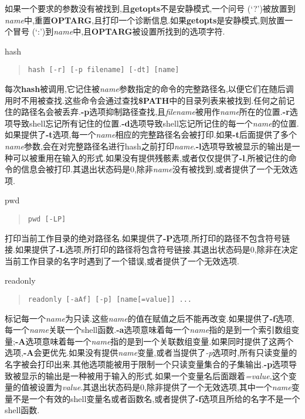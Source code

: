 \documentclass[draft,openany]{book}
\begin{document}
\begin{CJK}{UTF8}{gbsn}
\begin{basedescript}{\desclabelstyle{\nextlinelabel}\desclabelwidth{2.5em}}
        如果一个要求的参数没有被找到,且\textbf{getopts}不是安静模式,一个问号 (`?')被放置到\emph{name}中,重置\textbf{OPTARG},且打印一个诊断信息.如果\textbf{getopts}是安静模式,则放置一个冒号 (`:')到\emph{name}中,且\textbf{OPTARG}被设置所找到的选项字符.
    \item[hash]
        \begin{quote}
            \verb+hash [-r] [-p filename] [-dt] [name]+
        \end{quote}
        每次\textbf{hash}被调用,它记住被\emph{name}参数指定的命令的完整路径名,以便它们在随后调用时不用被查找.这些命令会通过查找\textbf{\$PATH}中的目录列表来被找到.任何之前记住的路径名会被丢弃.\textbf{-p}选项抑制路径查找,且\emph{filename}被用作\emph{name}所在的位置.\textbf{-r}选项导致shell忘记所有记住的位置.\textbf{-d}选项导致shell忘记所记住的每一个\emph{name}的位置.如果提供了\textbf{-t}选项,每一个\emph{name}相应的完整路径名会被打印.如果\textbf{-t}后面提供了多个\emph{name}参数,会在对完整路径名进行hash之前打印\emph{name}.\textbf{-l}选项导致被显示的输出是一种可以被重用在输入的形式.如果没有提供残骸素,或者仅仅提供了\textbf{-l},所被记住的命令的信息会被打印.其退出状态码是0,除非\emph{name}没有被找到,或者提供了一个无效选项.
    \item[pwd]
        \begin{quote}
            \verb+pwd [-LP]+
        \end{quote}
        打印当前工作目录的绝对路径名.如果提供了\textbf{-P}选项,所打印的路径不包含符号链接.如果提供了\textbf{-L}选项,所打印的路径将包含符号链接.其退出状态码是0,除非在决定当前工作目录的名字时遇到了一个错误,或者提供了一个无效选项.
    \item[readonly]
        \begin{quote}
            \verb+readonly [-aAf] [-p] [name[=value]] ...+
        \end{quote}
        标记每一个\emph{name}为只读.这些\emph{name}的值在赋值之后不能再改变.如果提供了\textbf{-f}选项,每一个\emph{name}关联一个shell函数.\textbf{-a}选项意味着每一个\emph{name}指的是到一个索引数组变量;\textbf{-A}选项意味着每一个\emph{name}指的是到一个关联数组变量.如果同时提供了这两个选项,\textbf{-A}会更优先.如果没有提供\emph{name}变量,或者当提供了\emph{-p}选项时,所有只读变量的名字被会打印出来.其他选项能被用于限制一个只读变量集合的子集输出.\textbf{-p}选项导致被显示的输出是一种被用于输入的形式.如果一个变量名后面跟着\emph{=value},这个变量的值被设置为\emph{value}.其退出状态码是0,除非提供了一个无效选项,其中一个\emph{name}变量不是一个有效的shell变量名或者函数名,或者提供了\textbf{-f}选项且所给的名字不是一个shell函数.

\end{basedescript}
\end{CJK}
\end{document}
